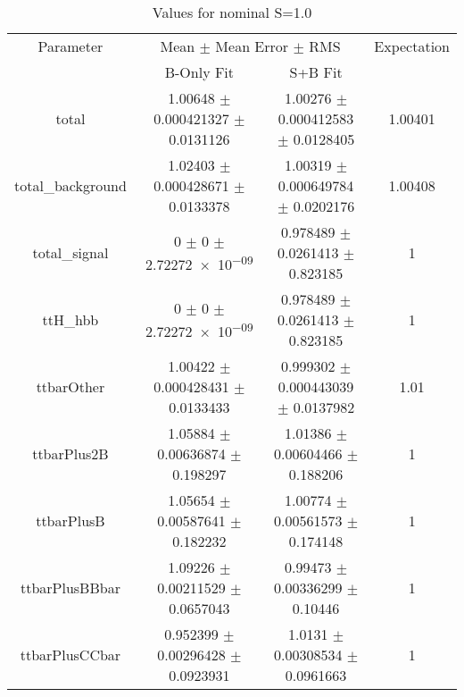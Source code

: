 \begin{table}
\centering
\caption{Values for nominal S=1.0}
\begin{tabular}{cccc}
\toprule
Parameter & \multicolumn{2}{c}{Mean $\pm$ Mean Error $\pm$ RMS} & Expectation\\
 & B-Only Fit & S+B Fit & \\
\midrule
total & \num{1.00648} $\pm$ \num{0.000421327} $\pm$ \num{0.0131126} & \num{1.00276} $\pm$ \num{0.000412583} $\pm$ \num{0.0128405} & \num{1.00401}\\
total\_background & \num{1.02403} $\pm$ \num{0.000428671} $\pm$ \num{0.0133378} & \num{1.00319} $\pm$ \num{0.000649784} $\pm$ \num{0.0202176} & \num{1.00408}\\
total\_signal & \num{0} $\pm$ \num{0} $\pm$ \num{2.72272e-09} & \num{0.978489} $\pm$ \num{0.0261413} $\pm$ \num{0.823185} & \num{1}\\
ttH\_hbb & \num{0} $\pm$ \num{0} $\pm$ \num{2.72272e-09} & \num{0.978489} $\pm$ \num{0.0261413} $\pm$ \num{0.823185} & \num{1}\\
ttbarOther & \num{1.00422} $\pm$ \num{0.000428431} $\pm$ \num{0.0133433} & \num{0.999302} $\pm$ \num{0.000443039} $\pm$ \num{0.0137982} & \num{1.01}\\
ttbarPlus2B & \num{1.05884} $\pm$ \num{0.00636874} $\pm$ \num{0.198297} & \num{1.01386} $\pm$ \num{0.00604466} $\pm$ \num{0.188206} & \num{1}\\
ttbarPlusB & \num{1.05654} $\pm$ \num{0.00587641} $\pm$ \num{0.182232} & \num{1.00774} $\pm$ \num{0.00561573} $\pm$ \num{0.174148} & \num{1}\\
ttbarPlusBBbar & \num{1.09226} $\pm$ \num{0.00211529} $\pm$ \num{0.0657043} & \num{0.99473} $\pm$ \num{0.00336299} $\pm$ \num{0.10446} & \num{1}\\
ttbarPlusCCbar & \num{0.952399} $\pm$ \num{0.00296428} $\pm$ \num{0.0923931} & \num{1.0131} $\pm$ \num{0.00308534} $\pm$ \num{0.0961663} & \num{1}\\
\bottomrule
\end{tabular}
\end{table}